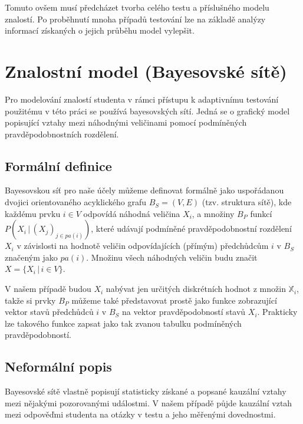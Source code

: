 \documentclass[a4paper,twoside,12pt]{book}
\begin{document}
Tomuto ovšem musí předcházet tvorba celého testu a příslušného modelu znalostí. Po proběhnutí mnoha případů testování lze na základě analýzy informací získaných o jejich průběhu model vylepšit.
%



\chapter{Znalostní model (Bayesovské sítě)}
Pro modelování znalostí studenta v rámci přístupu k adaptivnímu testování použitému v této práci se používá bayesovských sítí. Jedná se o grafický model popisující vztahy mezi náhodnými veličinami pomocí podmíněných pravděpodobnostních rozdělení.

\section{Formální definice}
Bayesovskou síť pro naše účely můžeme definovat formálně jako uspořádanou dvojici orientovaného acyklického grafu $B_S = (V,E)$ (tzv. struktura sítě), kde každému prvku $i \in V$ odpovídá náhodná veličina $X_i$, a množiny $B_P$  funkcí $P(X_i\,|\,(X_j)_{j\in pa(i)})$, které udávají podmíněné pravděpodobnostní rozdělení $X_i$ v závislosti na hodnotě veličin odpovídajících (přímým) předchůdcům $i$ v $B_S$ značeným jako $pa(i)$. Množinu všech náhodných veličin budu značit $X=\{X_i\,|\,i \in V\}$.

V našem případě budou $X_i$ nabývat jen určitých diskrétních hodnot z množin $\mathbb{X}_i$, takže si prvky $B_P$ můžeme také představovat prostě jako funkce zobrazující vektor stavů předchůdců $i$ v $B_S$ na vektor pravděpodobností stavů $X_i$. Prakticky lze takového funkce zapsat jako tak zvanou tabulku podmíněných pravděpodobností.

\section{Neformální popis}
Bayesovské sítě vlastně popisují statisticky získané a popsané kauzální vztahy mezi nějakými pozorovanými událostmi. V našem případě půjde kauzální vztah mezi odpověďmi studenta na otázky v testu a jeho měřenými dovednostmi.
\end{document}
